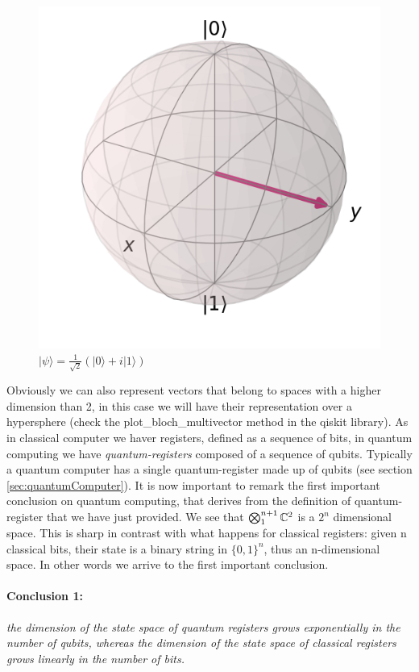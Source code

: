 \documentclass[english]{article}
\newcommand{\sbigotimes}{%
	\mathop{\mathchoice{\textstyle\bigotimes}{\bigotimes}{\bigotimes}{\bigotimes}}%
}
\begin{document}
\begin{enumerate}
\begin{figure}[h]
\begin{minipage}{0.4\textwidth}
							\includegraphics[scale=0.35]{yket.png}
							\caption{$|\psi\rangle = \frac{1}{\sqrt{2}}(|0\rangle+i|1\rangle)$}
						\end{minipage}
					\end{figure}
				\end{enumerate}
			
			Obviously we can also represent vectors that belong to spaces with a higher dimension than 2, in this case we will have their representation over a hypersphere (check the plot\_bloch\_multivector method in the qiskit library). As in classical computer we haver registers, defined as a sequence of bits, in quantum computing we have \emph{quantum-registers} composed of a sequence of qubits. Typically a quantum computer has a single quantum-register made up of qubits (see section \ref{sec:quantumComputer}). It is now important to remark the first important conclusion on quantum computing, that derives from the definition of quantum-register that we have just provided. We see that $\sbigotimes_1^{n+1} \mathbb{C}^{2}$ is a $2^{n}$ dimensional space. This is sharp in contrast with what happens for classical registers: given n classical bits, their state is a binary string in $\{0,1\}^{n}$, thus an n-dimensional space. In other words we arrive to the first important conclusion.
			
			\paragraph{Conclusion 1:} \emph{the dimension of the state space of quantum registers grows exponentially in the number of qubits, whereas the dimension of the state space of classical registers grows linearly in the number of bits.}
			
\end{document}

